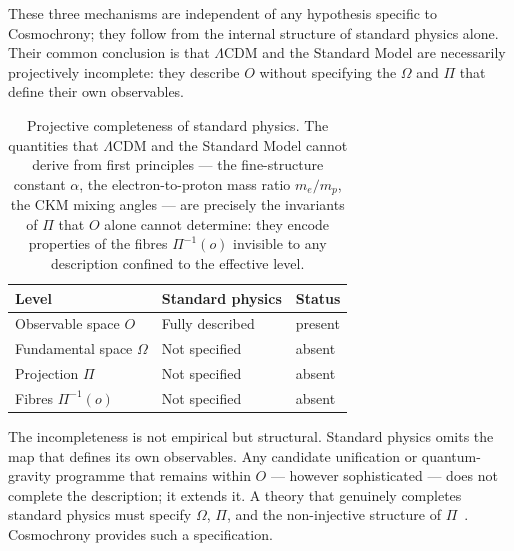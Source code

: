   These three mechanisms are independent of any hypothesis specific to
  Cosmochrony; they follow from the internal structure of standard physics
  alone.
  Their common conclusion is that $\Lambda$CDM and the Standard Model are
  necessarily projectively incomplete: they describe $O$ without specifying
  the $\Omega$ and $\Pi$ that define their own observables.

  \begin{table}[ht]
    \centering
    \begin{tabular}{lll}
      \hline
      \textbf{Level} & \textbf{Standard physics} & \textbf{Status} \\
      \hline
      Observable space $O$        & Fully described   & present \\
      Fundamental space $\Omega$  & Not specified     & absent  \\
      Projection $\Pi$            & Not specified     & absent  \\
      Fibres $\Pi^{-1}(o)$        & Not specified     & absent  \\
      \hline
    \end{tabular}
    \caption{Projective completeness of standard physics.
    The quantities that $\Lambda$CDM and the Standard Model cannot
    derive from first principles --- the fine-structure constant $\alpha$,
      the electron-to-proton mass ratio $m_e/m_p$, the CKM mixing angles ---
      are precisely the invariants of $\Pi$ that $O$ alone cannot determine:
      they encode properties of the fibres $\Pi^{-1}(o)$ invisible to any
      description confined to the effective level.}
    \label{tab:projective-completeness}
  \end{table}

  The incompleteness is not empirical but structural.
  Standard physics omits the map that defines its own observables.
  Any candidate unification or quantum-gravity programme that remains within
  $O$ --- however sophisticated --- does not complete the description; it
  extends it.
  A theory that genuinely completes standard physics must specify $\Omega$,
  $\Pi$, and the non-injective structure of $\Pi$~\cite{Beau2026l}.
  Cosmochrony provides such a specification.
